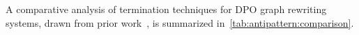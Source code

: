 
 

 




A comparative analysis of termination techniques for DPO graph rewriting systems, drawn from prior work~\cite{plump1995ontermination,plump2018modular,bruggink2014termination,bruggink2015proving,endrullis2024generalized_arxiv_v2,
overbeek2024termination_lmcs}, is summarized in~\autoref{tab:antipattern:comparison}. 
 
